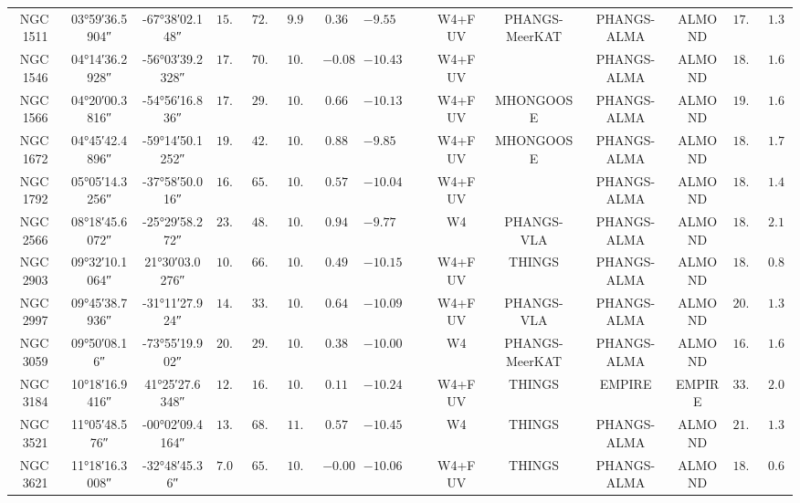 \documentclass[letter, longauth]{aa} %
\newcommand*{\ra}[2][]{{
		\ang[
		angle-symbol-degree=\textsuperscript{h},
		angle-symbol-minute=\textsuperscript{m},
		angle-symbol-second=\textsuperscript{s},
		#1]{#2}%
}}
\newcommand{\cmark}{\textcolor{green}{\ding{51}}}
\newcommand{\xmark}{\textcolor{red}{\ding{55}}}
\begin{document}
\begin{appendix}
\begin{table}
\begin{center}
{\begin{tabular}{cccccccccccccccc}
NGC\,1511 & \ra{03;59;36.5904} & \ang{-67;38;02.148} & $15.28$ & $72.70$ & $9.91$ & $0.36$ & $-9.55$ & \xmark & \xmark & W4+FUV & PHANGS-MeerKAT & PHANGS-ALMA & ALMOND & $17.60$ & $1.30$ \\
NGC\,1546 & \ra{04;14;36.2928} & \ang{-56;03;39.2328} & $17.69$ & $70.30$ & $10.35$ & $-0.08$ & $-10.43$ & \xmark & \xmark & W4+FUV & \xmark & PHANGS-ALMA & ALMOND & $18.90$ & $1.62$ \\
NGC\,1566 & \ra{04;20;00.3816} & \ang{-54;56;16.836} & $17.69$ & $29.50$ & $10.78$ & $0.66$ & $-10.13$ & \cmark & \cmark & W4+FUV & MHONGOOSE & PHANGS-ALMA & ALMOND & $19.70$ & $1.69$ \\
NGC\,1672 & \ra{04;45;42.4896} & \ang{-59;14;50.1252} & $19.40$ & $42.60$ & $10.73$ & $0.88$ & $-9.85$ & \cmark & \cmark & W4+FUV & MHONGOOSE & PHANGS-ALMA & ALMOND & $18.20$ & $1.71$ \\
NGC\,1792 & \ra{05;05;14.3256} & \ang{-37;58;50.016} & $16.20$ & $65.10$ & $10.61$ & $0.57$ & $-10.04$ & \xmark & \xmark & W4+FUV & \xmark & PHANGS-ALMA & ALMOND & $18.70$ & $1.47$ \\
NGC\,2566 & \ra{08;18;45.6072} & \ang{-25;29;58.272} & $23.44$ & $48.50$ & $10.71$ & $0.94$ & $-9.77$ & \cmark & \xmark & W4 & PHANGS-VLA & PHANGS-ALMA & ALMOND & $18.50$ & $2.10$ \\
NGC\,2903 & \ra{09;32;10.1064} & \ang{+21;30;03.0276} & $10.00$ & $66.80$ & $10.63$ & $0.49$ & $-10.15$ & \cmark & \xmark & W4+FUV & THINGS & PHANGS-ALMA & ALMOND & $18.30$ & $0.89$ \\
NGC\,2997 & \ra{09;45;38.7936} & \ang{-31;11;27.924} & $14.06$ & $33.00$ & $10.73$ & $0.64$ & $-10.09$ & \xmark & \xmark & W4+FUV & PHANGS-VLA & PHANGS-ALMA & ALMOND & $20.40$ & $1.39$ \\
NGC\,3059 & \ra{09;50;08.16} & \ang{-73;55;19.902} & $20.23$ & $29.40$ & $10.38$ & $0.38$ & $-10.00$ & \cmark & \xmark & W4 & PHANGS-MeerKAT & PHANGS-ALMA & ALMOND & $16.70$ & $1.64$ \\
NGC\,3184 & \ra{10;18;16.9416} & \ang{+41;25;27.6348} & $12.58$ & $16.00$ & $10.36$ & $0.11$ & $-10.24$ & \cmark & \cmark & W4+FUV & THINGS & EMPIRE & EMPIRE & $33.30$ & $2.03$ \\
NGC\,3521 & \ra{11;05;48.576} & \ang{-00;02;09.4164} & $13.24$ & $68.80$ & $11.02$ & $0.57$ & $-10.45$ & \xmark & \xmark & W4 & THINGS & PHANGS-ALMA & ALMOND & $21.10$ & $1.35$ \\
NGC\,3621 & \ra{11;18;16.3008} & \ang{-32;48;45.36} & $7.06$ & $65.80$ & $10.06$ & $-0.00$ & $-10.06$ & \xmark & \cmark & W4+FUV & THINGS & PHANGS-ALMA & ALMOND & $18.90$ & $0.65$ \\

\end{tabular}}
\end{center}
\end{table}
\end{appendix}
\end{document}
